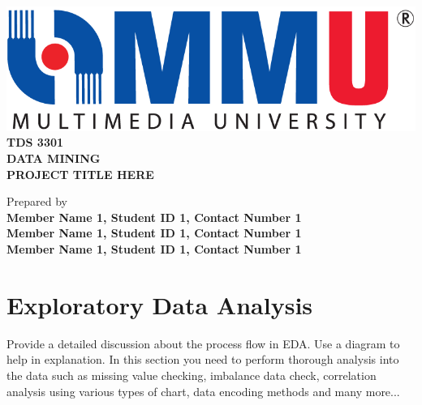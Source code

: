\documentclass[12pt,a4paper,oneside]{article}
\begin{document}
\begin{center}

\includegraphics[scale=0.30]{mmu.png}\\
\vspace{1cm}
\Large{\textbf{TDS 3301 \\DATA MINING}} \\
\vspace{2.5cm}
\Large{\textbf{PROJECT TITLE HERE}} \\
\vspace{1cm}
 


\vspace{8.5cm}


\normalsize{Prepared by} \\
\vspace{2.5cm}
\large{\textbf{Member Name 1, Student ID 1, Contact Number 1}} \\ 
\large{\textbf{Member Name 1, Student ID 1, Contact Number 1}} \\ 
\large{\textbf{Member Name 1, Student ID 1, Contact Number 1}} \\ 
 

\end{center}

\thispagestyle{empty}
 
\clearpage 


\section{Exploratory Data Analysis}

Provide a detailed discussion about the process flow in EDA. Use a diagram to help in explanation. In this section you need to perform thorough analysis into the data such as missing value checking, imbalance data check, correlation analysis using various types of chart, data encoding methods and many more... 
\end{document}
